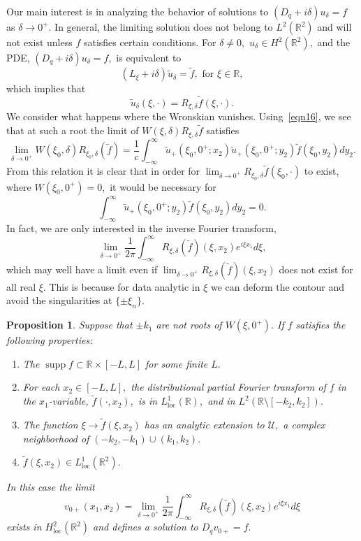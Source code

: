 \documentclass[11pt]{article}
\newcommand\loc{\operatorname{loc}}
\newcommand\cU{\mathcal U}
\newcommand\tu{\widetilde u}
\newcommand\tf{\tilde{f}}
\newcommand\bbR{\mathbb R}
\newcommand\supp{\operatorname{supp}}
\newtheorem{proposition}{Proposition}
\theoremstyle{definition}
\theoremstyle{remark}
\begin{document}
Our main interest is in analyzing the behavior of solutions to
$(D_{q}+i\delta) u_{\delta}=f$ as $\delta\to 0^+.$ In general, the
limiting solution does not belong to $L^2(\bbR^2)$ and will not exist
unless $f$ satisfies certain conditions.  For $\delta\neq 0,$
$u_{\delta}\in H^2(\bbR^2),$ and the PDE, $(D_q+i\delta)u_{\delta}=f,$
is equivalent to
 \begin{equation}
  (L_{\xi}+i\delta)\tu_{\delta}=\tf,\text{ for }\xi\in\bbR,
 \end{equation}
 which implies that
 \begin{equation}
   \tu_{\delta}(\xi,\cdot)=R_{\xi,\delta}\tf(\xi,\cdot).
 \end{equation}
 We  consider what happens where the Wronskian
vanishes.  Using~\eqref{eqn16}, we see that at such a root the
limit of $W(\xi,\delta)R_{\xi,\delta}\tf$ satisfies
\begin{equation}
  \lim_{\delta\to 0^+}W(\xi_0,\delta)R_{\xi_0,\delta}(\tf)=\frac{1}{c}
  \int_{-\infty}^{\infty}\tu_+(\xi_0,0^+;x_2)\tu_+(\xi_0,0^+;y_2)\tf(\xi_0,y_2)dy_2.
  \end{equation}
From this relation it is clear that in order for $\lim_{\delta\to
  0^+}R_{\xi_0,\delta}\tf(\xi_0,\cdot)$ to exist, where $W(\xi_0,0^+)=0,$ it would be
necessary for
\begin{equation}\label{eqn28}
  \int_{-\infty}^{\infty}\tu_+(\xi_0,0^+;y_2)\tf(\xi_0,y_2)dy_2=0.
\end{equation}
In fact, we are only interested in the inverse Fourier transform,
\begin{equation}\label{eqn173.31}
\lim_{\delta\to 0^+} \frac{1}{2\pi} \int_{-\infty}^{\infty}R_{\xi,\delta}(\tf)(\xi,x_2)e^{i\xi x_1}d\xi,
\end{equation}
which may well have a limit even if
$\lim_{\delta\to
  0^+}R_{\xi,\delta}(\tf)(\xi,x_2)$ does not exist for all real $\xi.$
This is because for data analytic in $\xi$ we can deform the contour
and avoid the singularities at $\{\pm\xi_n\}.$
\begin{proposition}\label{prop5.230}
 Suppose that $\pm k_1$ are not  roots of $W(\xi,0^+).$  If $f$ satisfies
 the following properties:
 \begin{enumerate}
   \item The $\supp f\subset \bbR\times [-L,L]$ for some finite $L.$
 \item For each $x_2\in[-L,L],$ the distributional partial Fourier
   transform of $f$ in the $x_1$-variable, $\tf(\cdot,x_2),$ is in
   $L^1_{\loc}(\bbR),$ and in $L^2(\bbR\setminus [-k_2,k_2]).$
   \item The function $\xi\to\tf(\xi,x_2)$ has an analytic extension
     to $\cU,$ a complex neighborhood of $(-k_2,-k_1)\cup (k_1,k_2).$
     \item $\tf(\xi,x_2)\in L^1_{\loc}(\bbR^2).$
 \end{enumerate}
In this case the limit
\begin{equation}\label{eqn43.23}
v_{0+}(x_1,x_2)=  \lim_{\delta\to 0^+}
\frac{1}{2\pi}   \int_{-\infty}^{\infty}R_{\xi,\delta}(\tf)(\xi,x_2)e^{i\xi x_1}d\xi
\end{equation}
exists in $H^2_{\loc}(\bbR^2)$ and defines a solution to $D_{q}v_{0+}=f.$
\end{proposition}
\end{document}
